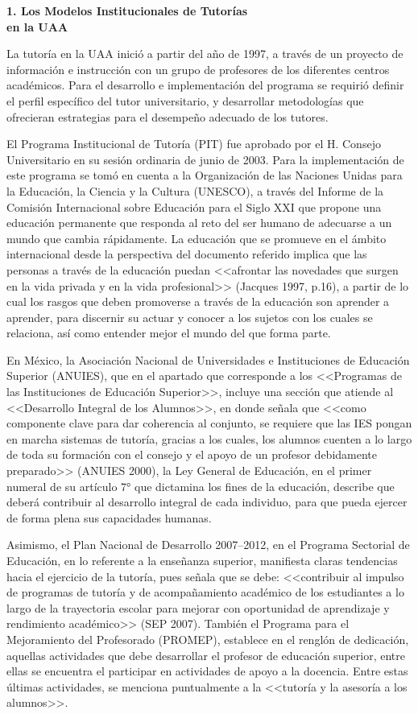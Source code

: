 {\bfseries 1. Los Modelos Institucionales de Tutorías\\ en la  UAA}

La tutoría en la UAA inició a partir del año de 1997, a través de un
proyecto de información e instrucción con un grupo de profesores de los
diferentes centros académicos. Para el desarrollo e implementación del
programa se requirió definir el perfil específico del tutor universitario,
y desarrollar metodologías que ofrecieran estrategias para el desempeño
adecuado de los tutores.

El Programa Institucional de Tutoría (PIT) fue aprobado por el H. Consejo
Universitario en su sesión ordinaria de junio de 2003. Para la
implementación de este programa se tomó en cuenta a  la Organización de las
Naciones Unidas para la Educación, la Ciencia y la Cultura (UNESCO), a
través del Informe de la Comisión Internacional sobre Educación para el
Siglo XXI que propone una educación permanente que responda al reto del ser
humano de adecuarse a un mundo que cambia rápidamente. La educación que se
promueve en el ámbito internacional desde la perspectiva del documento
referido implica que las personas a través de la educación puedan <<afrontar
las novedades que surgen en la vida privada y en la vida profesional>>
(Jacques 1997, p.16), a partir de lo cual los rasgos que deben promoverse a
través de la educación son aprender a aprender, para discernir su actuar y
conocer a los sujetos con los cuales se relaciona, así como entender mejor
el mundo del que forma parte.

En México, la Asociación Nacional de Universidades e Instituciones de
Educación Superior (ANUIES), que en el apartado que corresponde a los
<<Programas de las Instituciones de Educación Superior>>, incluye una sección
que atiende al <<Desarrollo Integral de los Alumnos>>, en donde señala que
<<como componente clave para dar coherencia al conjunto, se requiere que las
IES pongan en marcha sistemas de tutoría, gracias a los cuales, los alumnos
cuenten a lo largo de toda su formación con el consejo y el apoyo de un
profesor debidamente preparado>> (ANUIES 2000), la Ley General de
Educación, en el primer numeral de su artículo 7° que dictamina los fines
de la educación, describe que deberá contribuir al desarrollo integral de
cada individuo, para que pueda ejercer de forma plena sus capacidades
humanas.

\enlargethispage{1\baselineskip}
Asimismo, el Plan Nacional de Desarrollo 2007--2012, en el Programa Sectorial
de Educación, en lo referente a la enseñanza superior, manifiesta claras
tendencias hacia el ejercicio de la tutoría, pues señala que se debe:
<<contribuir al impulso de programas de tutoría y de acompañamiento
académico de los estudiantes a lo largo de la trayectoria escolar para
mejorar con oportunidad de aprendizaje y rendimiento académico>> (SEP
2007). También el Programa para el Mejoramiento del Profesorado (PROMEP),
establece en el renglón de dedicación, aquellas actividades que debe
desarrollar el profesor de educación superior, entre ellas se encuentra el
participar en actividades de apoyo a la docencia. Entre estas últimas
actividades, se menciona puntualmente a la <<tutoría y la asesoría a los
alumnos>>.

